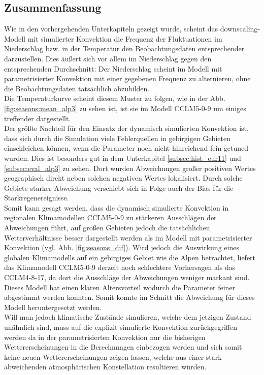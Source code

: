 \subsection{Zusammenfassung}
Wie in den vorhergehenden Unterkapiteln gezeigt wurde, scheint das downscaling-Modell mit simulierter Konvektion die Frequenz der Fluktuationen im Niederschlag bzw. in der Temperatur den Beobachtungsdaten entsprechender darzustellen. Dies äußert sich vor allem im Niederschlag gegen den entsprechenden Durchschnitt: Der Niederschlag scheint im Modell mit parametrisierter Konvektion mit einer gegebenen Frequenz zu alternieren, ohne die Beobachtungsdaten tatsächlich abzubilden.\\
Die Temperaturkurve scheint diesem Muster zu folgen, wie in der Abb.\ref{fig:seasons:mean_alp3} zu sehen ist, ist sie im Modell CCLM5-0-9 um einiges treffender dargestellt.\\
Der größte Nachteil für den Einsatz der dynamisch simulierten Konvektion ist, dass sich durch die Simulation viele Fehlerquellen in gebirgigen Gebieten einschleichen können, wenn die Parameter noch nicht hinreichend fein-getuned wurden. Dies ist besonders gut in dem Unterkapitel \ref{subsec:hist_eur11} und \ref{subsec:eval_alp3} zu sehen. Dort wurden Abweichungen großer positiven Wertes geographisch direkt neben solchen negativen Wertes lokalisiert. Durch solche Gebiete starker Abweichung verschiebt sich in Folge auch der Bias für die Starkregenereignisse.\\
Somit kann gesagt werden, dass die dynamisch simulierte Konvektion in regionalen Klimamodellen CCLM5-0-9 zu stärkeren Ausschlägen der Abweichungen führt, auf großen Gebieten jedoch die tatsächlichen Wetterverhältnisse besser dargestellt werden als im Modell mit parametrisierter Konvektion (vgl. Abb. \ref{fig:seasons_dif}). Wird jedoch die Auswirkung eines globalen Klimamodells auf ein gebirgiges Gebiet wie die Alpen betrachtet, liefert das Klimamodell CCLM5-0-9 derzeit noch schlechtere Vorhersagen als das CCLM4-8-17, da dort die Ausschläge der Abweichungen weniger markant sind. Dieses Modell hat einen klaren Altersvorteil wodurch die Parameter feiner abgestimmt werden konnten. Somit konnte im Schnitt die Abweichung für dieses Modell heruntergesetzt werden.\\
Will man jedoch klimatische Zustände simulieren, welche dem jetzigen Zustand unähnlich sind, muss auf die explizit simulierte Konvektion zurückgegriffen werden da in der parametrisierten Konvektion nur die bisherigen Wettererscheinungen in die Berechnungen einbezogen werden und sich somit keine neuen Wettererscheinungen zeigen lassen, welche aus einer stark abweichenden atmosphärischen Konstellation resultieren würden.\\

